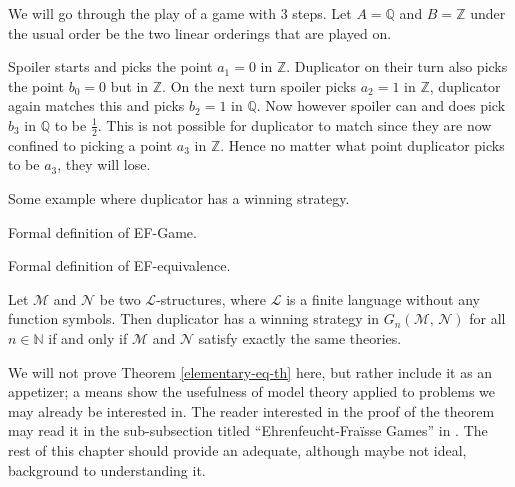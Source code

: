 \documentclass[../../main.tex]{subfiles}
\begin{document}
\begin{example}
    We will go through the play of a game with $3$ steps. 
    Let $A = \mathbb{Q}$ and $B=\mathbb{Z}$ under the usual order be the two linear orderings that are played on.
    
    Spoiler starts and picks the point $a_1 = 0$ in $\mathbb{Z}$. Duplicator on their turn also picks the point $b_0 = 0$ but in $\mathbb{Z}$.
    On the next turn spoiler picks $a_2 = 1$ in $\mathbb{Z}$, duplicator again matches this and picks $b_2 = 1$ in $\mathbb{Q}$.
    Now however spoiler can and does pick $b_3$ in $\mathbb{Q}$ to be $\frac{1}{2}$. 
    This is not possible for duplicator to match since they are now confined to picking a point $a_3$ in $\mathbb{Z}$.
    Hence no matter what point duplicator picks to be $a_3$, they will lose.
\end{example}


\begin{example}
    Some example where duplicator has a winning strategy.
\end{example}

\begin{definition}\cite[Definition 6.2]{Ros82}
    Formal definition of EF-Game.
\end{definition}

\begin{definition}[$G_n$-equivalence]\cite[Definition 6.8]{Ros82}
    Formal definition of EF-equivalence.
\end{definition}

\begin{theorem}\cite[Theorem 2.4.6]{Mar02}\label{elementary-eq-th}
    Let $\mathcal{M}$ and $\mathcal{N}$ be two $\mathcal{L}$-structures, where $\mathcal{L}$ is a finite language without any function symbols.
    Then duplicator has a winning strategy in $G_n(\mathcal{M},\, \mathcal{N})$ for all $n \in \mathbb{N}$ if and only if $\mathcal{M}$ and $\mathcal{N}$ satisfy exactly the same theories.
\end{theorem}

We will not prove Theorem \ref{elementary-eq-th} here, but rather include it as an appetizer;
a means show the usefulness of model theory applied to problems we may already be interested in.
The reader interested in the proof of the theorem may read it in the sub-subsection titled ``Ehrenfeucht-Fra\"isse Games'' in \cite[\S 2.4]{Mar02}.
The rest of this chapter should provide an adequate, although maybe not ideal, background to understanding it.
\end{document}
